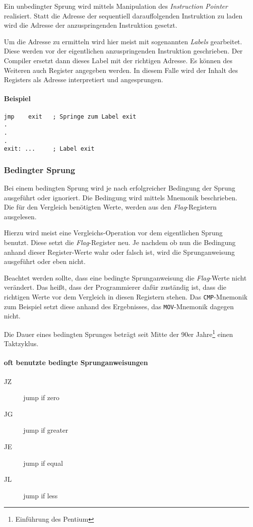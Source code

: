 Ein unbedingter Sprung wird mittels Manipulation des \textit{Instruction Pointer} realisiert.
Statt die Adresse der sequentiell darauffolgenden Instruktion zu laden wird die Adresse der anzuspringenden Instruktion gesetzt.

Um die Adresse zu ermitteln wird hier meist mit sogenannten \textit{Labels} gearbeitet. Diese werden vor der eigentlichen anzuspringenden Instruktion geschrieben. Der Compiler ersetzt dann dieses Label mit der richtigen Adresse. Es können des Weiteren auch Register angegeben werden. In diesem Falle wird der Inhalt des Registers als Adresse interpretiert und angesprungen.

\paragraph{Beispiel\newline}\makebox{}
\begin{lstlisting}
jmp    exit   ; Springe zum Label exit
.
.
.
exit: ...     ; Label exit
\end{lstlisting}

\subsubsection{Bedingter Sprung}
Bei einem bedingten Sprung wird je nach erfolgreicher Bedingung der Sprung ausgeführt oder ignoriert. Die Bedingung wird mittels Mnemonik beschrieben. Die für den Vergleich benötigten Werte, werden aus den \textit{Flag}-Registern ausgelesen.

Hierzu wird meist eine Vergleichs-Operation vor dem eigentlichen Sprung benutzt. Diese setzt die \textit{Flag}-Register neu. Je nachdem ob nun die Bedingung anhand dieser Register-Werte wahr oder falsch ist, wird die Sprunganweisung ausgeführt oder eben nicht.

Beachtet werden sollte, dass eine bedingte Sprunganweisung die \textit{Flag}-Werte nicht verändert. Das heißt, dass der Programmierer dafür zuständig ist, dass die richtigen Werte vor dem Vergleich in diesen Registern stehen. Das \texttt{CMP}-Mnemonik zum Beispiel setzt diese anhand des Ergebnisses, das \texttt{MOV}-Mnemonik dagegen nicht.

Die Dauer eines bedingten Sprunges beträgt seit Mitte der 90er Jahre\footnote{Einführung des Pentium} einen Taktzyklus.

\paragraph{oft benutzte bedingte Sprunganweisungen}
\begin{description}
    \item [JZ] jump if zero
    \item [JG] jump if greater
    \item [JE] jump if equal
    \item [JL] jump if less
\end{description}

